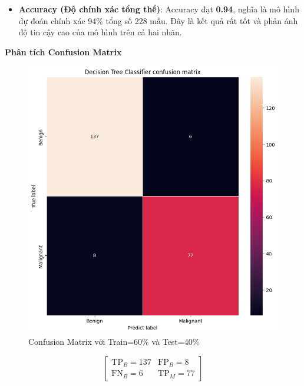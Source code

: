 \begin{itemize}
	\item \textbf{Accuracy (Độ chính xác tổng thể)}:  
	Accuracy đạt \textbf{0.94}, nghĩa là mô hình dự đoán chính xác 94\% tổng số 228 mẫu. Đây là kết quả rất tốt và phản ánh độ tin cậy cao của mô hình trên cả hai nhãn.
\end{itemize}


\textbf{Phân tích Confusion Matrix}


\begin{figure}[h!]
	\centering
	\begin{minipage}[b]{0.43\linewidth}
		\centering
		\includegraphics[width=\linewidth]{figures/dataset1/6040.png}
		\caption{Confusion Matrix với Train=60\% và Test=40\%}
		\label{fig:confusion_6040}
	\end{minipage}
\end{figure}

\[
\begin{bmatrix}
	\text{TP}_{B} = 137 & \text{FP}_{B} = 8 \\
	\text{FN}_{B} = 6   & \text{TP}_{M} = 77
\end{bmatrix}
\]

